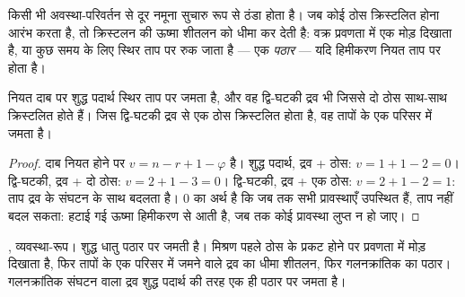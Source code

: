 किसी भी अवस्था-परिवर्तन से दूर नमूना सुचारु रूप से ठंडा होता है। जब कोई ठोस
क्रिस्टलित होना आरंभ करता है, तो क्रिस्टलन की ऊष्मा शीतलन को धीमा कर देती है: वक्र
प्रवणता में एक मोड़ दिखाता है, या कुछ समय के लिए स्थिर ताप पर रुक जाता है --- एक
\textit{पठार} --- यदि हिमीकरण नियत ताप पर होता है।

\begin{proposition}[पठार]\label{prop:b2:solid-liquid-diagrams:plateaus}
नियत दाब पर शुद्ध पदार्थ स्थिर ताप पर जमता है, और
वह द्वि-घटकी द्रव भी जिससे दो ठोस साथ-साथ क्रिस्टलित होते हैं। जिस द्वि-घटकी
द्रव से एक ठोस क्रिस्टलित होता है, वह तापों के एक परिसर में जमता है।
\end{proposition}

\begin{proof}
दाब नियत होने पर  $v = n - r + 1 - \varphi$ है। शुद्ध
पदार्थ, द्रव + ठोस: $v = 1 + 1 - 2 = 0$। द्वि-घटकी, द्रव + दो ठोस:
$v = 2 + 1 - 3 = 0$। द्वि-घटकी, द्रव + एक ठोस: $v = 2 + 1 - 2 = 1$: ताप
द्रव के संघटन के साथ बदलता है।  0 का अर्थ है कि जब तक सभी प्रावस्थाएँ
उपस्थित हैं, ताप नहीं बदल सकता: हटाई गई ऊष्मा हिमीकरण से आती है,
जब तक कोई प्रावस्था लुप्त न हो जाए।
\end{proof}

\begin{omfigure}

{\small {}, व्यवस्था-रूप। शुद्ध धातु पठार पर जमती है। मिश्रण
पहले ठोस के प्रकट होने पर प्रवणता में मोड़ दिखाता है, फिर तापों के एक परिसर में
जमने वाले द्रव का धीमा शीतलन, फिर गलनक्रांतिक का
पठार। गलनक्रांतिक संघटन वाला द्रव शुद्ध पदार्थ की तरह एक ही पठार पर
जमता है।}
\end{omfigure}

